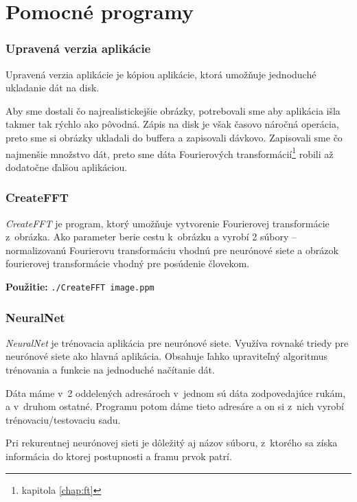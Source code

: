 \section{Pomocné programy}

\subsubsection{Upravená verzia aplikácie}
\label{chap:saveimageapp}
Upravená verzia aplikácie je kópiou aplikácie, ktorá umožňuje jednoduché ukladanie dát na disk.

Aby sme dostali čo najrealistickejšie obrázky, potrebovali sme aby aplikácia išla takmer tak rýchlo ako pôvodná. Zápis na disk je však časovo náročná operácia, preto sme si obrázky ukladali do buffera a zapisovali dávkovo. Zapisovali sme čo najmenšie množstvo dát, preto sme dáta Fourierových transformácií\footnote{kapitola \ref{chap:ft} } robili až dodatočne ďalšou aplikáciou.

\subsubsection{CreateFFT}

\textit{CreateFFT} je program, ktorý umožňuje vytvorenie Fourierovej transformácie z~obrázka. Ako parameter berie cestu k~obrázku a vyrobí 2 súbory -- normalizovanú Fourierovu transformáciu vhodnú pre neurónové siete a obrázok fourierovej transformácie vhodný pre posúdenie človekom.

\textbf{Použitie:} {\tt ./CreateFFT image.ppm}

\subsubsection{NeuralNet}
\textit{NeuralNet} je trénovacia aplikácia pre neurónové siete. Využíva rovnaké triedy pre neurónové siete ako hlavná aplikácia. Obsahuje ľahko upraviteľný algoritmus trénovania a funkcie na jednoduché načítanie dát. 

Dáta máme v~2 oddelených adresároch v~jednom sú dáta zodpovedajúce rukám, a v~druhom ostatné. Programu potom dáme tieto adresáre a on si z~nich vyrobí trénovaciu/testovaciu sadu.

Pri rekurentnej neurónovej sieti je dôležitý aj názov súboru, z~ktorého sa získa informácia do ktorej postupnosti a framu prvok patrí.

